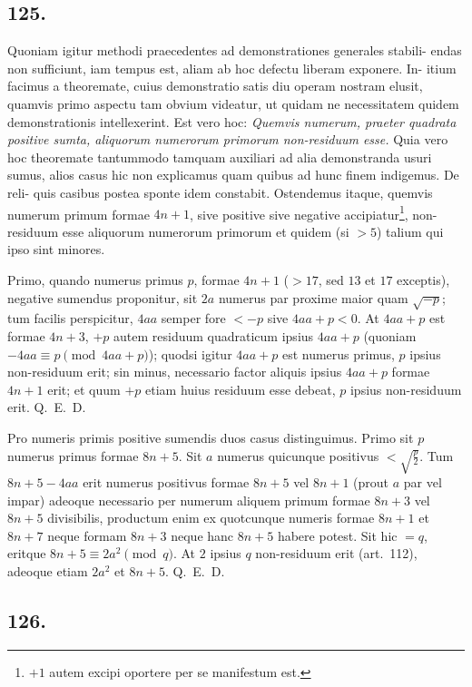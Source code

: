 \documentclass[12pt,a4paper]{article}
\theoremstyle{plain}
\theoremstyle{definition}
\theoremstyle{remark}
\begin{document}
\subsection*{125.}

Quoniam igitur methodi praecedentes ad demonstrationes generales stabili-
endas non sufficiunt, iam tempus est, aliam ab hoc defectu liberam exponere. In-
itium facimus a theoremate, cuius demonstratio satis diu operam nostram elusit,
quamvis primo aspectu tam obvium videatur, ut quidam ne necessitatem quidem
demonstrationis intellexerint. Est vero hoc: \emph{Quemvis numerum, praeter quadrata
positive sumta, aliquorum numerorum primorum non-residuum esse.} Quia vero hoc
theoremate tantummodo tamquam auxiliari ad alia demonstranda usuri sumus,
alios casus hic non explicamus quam quibus ad hunc finem indigemus. De reli-
quis casibus postea sponte idem constabit. Ostendemus itaque, quemvis numerum
primum formae $4n+1$, sive positive sive negative accipiatur\footnote{$+1$ autem excipi oportere per se manifestum est.}, non-residuum esse
aliquorum numerorum primorum et quidem (si $> 5$) talium qui ipso sint minores.

Primo, quando numerus primus $p$, formae $4n+1$ ($> 17$, sed $13$ et $17$
exceptis), negative sumendus proponitur, sit $2a$ numerus par proxime maior
quam $\sqrt{-p}$; tum facilis perspicitur, $4aa$ semper fore $< -p$ sive $4aa + p < 0$.
At $4aa + p$ est formae $4n+3$, $+p$ autem residuum quadraticum ipsius $4aa + p$
(quoniam $-4aa \equiv p \pmod{4aa+p}$); quodsi igitur $4aa + p$ est numerus primus,
$p$ ipsius non-residuum erit; sin minus, necessario factor aliquis ipsius $4aa + p$
formae $4n+1$ erit; et quum $+p$ etiam huius residuum esse debeat, $p$ ipsius
non-residuum erit. Q.~E.~D.

Pro numeris primis positive sumendis duos casus distinguimus. Primo sit
$p$ numerus primus formae $8n+5$. Sit $a$ numerus quicunque positivus $< \sqrt{\frac{p}{2}}$.
Tum $8n+5 - 4aa$ erit numerus positivus formae $8n+5$ vel $8n+1$ (prout $a$
par vel impar) adeoque necessario per numerum aliquem primum formae $8n+3$
vel $8n+5$ divisibilis, productum enim ex quotcunque numeris formae $8n+1$
et $8n+7$ neque formam $8n+3$ neque hanc $8n+5$ habere potest. Sit hic
$= q$, eritque $8n+5 \equiv 2a^2 \pmod{q}$. At $2$ ipsius $q$ non-residuum erit (art.~112),
adeoque etiam $2a^2$ et $8n+5$. Q.~E.~D.

\subsection*{126.}
\end{document}
